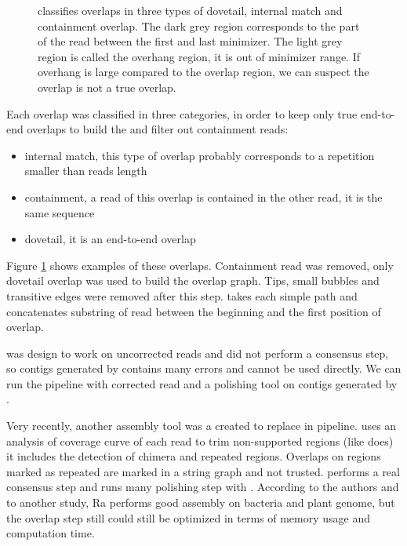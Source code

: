\documentclass[main]{subfiles}
\begin{document}
\begin{figure}[ht]
    \centering
    
    \caption{\miniasm classifies overlaps in three types of dovetail, internal match and containment overlap. The dark grey region corresponds to the part of the read between the first and last minimizer. The light grey region is called the overhang region, it is out of minimizer range. If overhang is large compared to the overlap region, we can suspect the overlap is not a true overlap.}
    \label{sota:fig:miniasm:ovl_classification}
\end{figure}

Each overlap was classified in three categories, in order to keep only true end-to-end overlaps to build the \OLC and filter out containment reads:
\begin{itemize}
    \item internal match, this type of overlap probably corresponds to a repetition smaller than reads length
    \item containment, a read of this overlap is contained in the other read, it is the same sequence
    \item dovetail, it is an end-to-end overlap
\end{itemize}
Figure \ref{sota:fig:miniasm:ovl_classification} shows examples of these overlaps. Containment read was removed, only dovetail overlap was used to build the overlap graph. Tips, small bubbles and transitive edges were removed after this step. \miniasm takes each simple path and concatenates substring of read between the beginning and the first position of overlap.

\miniasm was design to work on uncorrected reads and did not perform a consensus step, so contigs generated by \miniasm contains many errors and cannot be used directly. We can run the \minimap \miniasm pipeline with corrected read and a polishing tool on contigs generated by \miniasm.

Very recently, another assembly tool \cite{Ra} was a created to replace \miniasm in \minimap \miniasm pipeline.  uses an analysis of coverage curve of each read to trim non-supported regions (like \miniasm does) it includes the detection of chimera and repeated regions. Overlaps on regions marked as repeated are marked in a string graph and not trusted.  performs a real consensus step and runs many polishing step with . According to the authors and to another study\cite{long_read_assembler_comparison}, Ra performs good assembly on bacteria and plant genome, but the overlap step still could still be optimized in terms of memory usage and computation time.
\end{document}

